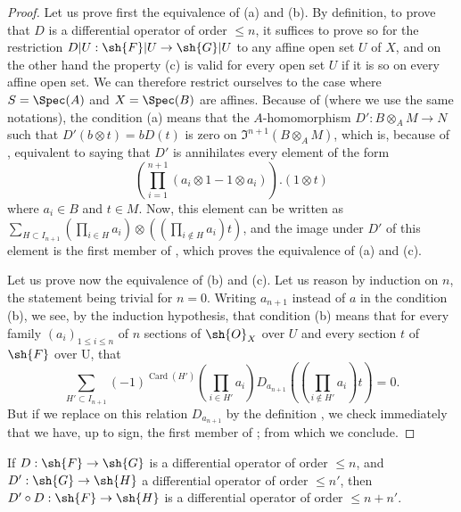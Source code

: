 \begin{proof}
Let us prove first the equivalence of (a) and (b).
By definition, to prove that $D$ is a differential operator of order $\leq n$, it suffices to prove so for the restriction $D|U: \sh{F}|U \to \sh{G}|U$ to any affine open set $U$ of $X$, and on the other hand the property (c) is valid for every open set $U$ if it is so on every affine open set.
We can therefore restrict ourselves to the case where $S = \Spec(A)$ and $X = \Spec(B)$ are affines.
Because of  (where we use the same notations), the condition (a) means that the $A$-homomorphism $D': B \otimes_A M \to N$ such that $D'(b \otimes t) = b D(t)$ is zero on $\mathfrak{I}^{n+1}(B \otimes_A M)$, which is, because of , equivalent to saying that $D'$ is annihilates every element of the form
\[
  (\prod_{i=1}^{n+1} (a_i \otimes 1 - 1 \otimes a_i) ) . (1 \otimes t)
\]
 where $a_i \in B$ and $t \in M$.
Now, this element can be written as $\sum_{H \subset I_{n+1}} (\prod_{i \in H} a_i) \otimes ((\prod_{i \notin H} a_i ) t )$, and the image under $D'$ of this element is the first member of , which proves the equivalence of (a) and (c).

Let us prove now the equivalence of (b) and (c).
Let us reason by induction on $n$, the statement being trivial for $n=0$.
Writing $a_{n+1}$ instead of $a$ in the condition (b), we see, by the induction hypothesis, that condition (b) means that for every family $(a_i)_{1 \leq i \leq n}$ of $n$ sections of $\sh{O}_X$ over $U$ and every section $t$ of $\sh{F}$ over U, that
\[
  \sum_{H' \subset I_{n+1}} (-1)^{\operatorname{Card}(H')}  (\prod_{i \in H'} a_i) D_{a_{n+1}} ((\prod_{i \notin H'} a_i ) t ) = 0.
\]
But if we replace on this relation $D_{a_{n+1}}$ by the definition , we check immediately that we have, up to sign, the first member of ;
from which we conclude.
\end{proof}

\begin{proposition}[16.8.9]
\label{IV.16.8.9}
If $D: \sh{F} \to \sh{G}$ is a differential operator of order $\leq n$, and $D': \sh{G} \to \sh{H}$ a differential operator of order $\leq n'$, then $D' \circ D: \sh{F} \to \sh{H}$ is a differential operator of order $\leq n + n'$.
\end{proposition}

